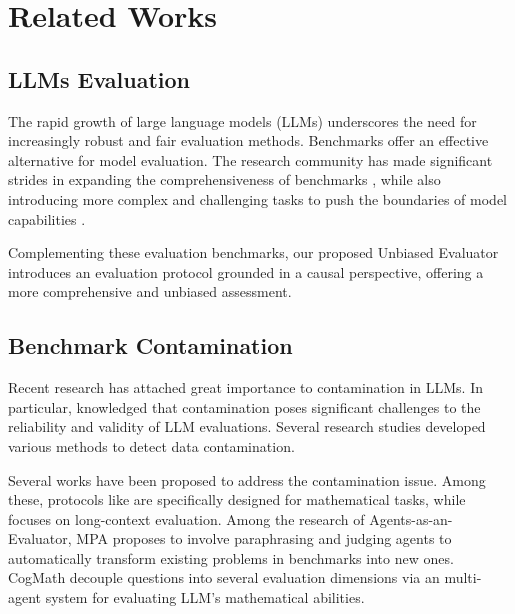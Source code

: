 \section{Related Works}
\subsection{LLMs Evaluation}
The rapid growth of large language models (LLMs) underscores the need for increasingly robust and fair evaluation methods.
Benchmarks offer an effective alternative for model evaluation. The research community has made significant strides in expanding the comprehensiveness of benchmarks \cite{wang2018glue, wang2019superglue, srivastava2022beyond, hendryckstest2021, liang2022holistic, white2024livebench}, while also introducing more complex and challenging tasks to push the boundaries of model capabilities \cite{wei2024measuring, he2024chinese, lightman2023let, aime2024a, amc2023b, he2024olympiadbench}. 

Complementing these evaluation benchmarks, our proposed Unbiased Evaluator introduces an evaluation protocol grounded in a causal perspective, offering a more comprehensive and unbiased assessment.



\subsection{Benchmark Contamination}
Recent research has attached great importance to contamination in LLMs. In particular, \cite{lee2021deduplicating,sainz2023nlp,mcintosh2024inadequacies,riddell2024quantifying,jiang2024does} knowledged that contamination poses significant challenges to the reliability and validity of LLM evaluations. Several research studies \cite{ni2024training} developed various methods to detect data contamination.

Several works \cite{fan2023nphardeval, lei2023s3eval, zhu2023dyval, zhu2024dynamic, liucogmath} have been proposed to address the contamination issue. Among these, protocols like \cite{fan2023nphardeval, zhu2023dyval, liucogmath} are specifically designed for mathematical tasks, while \cite{lei2023s3eval} focuses on long-context evaluation.
Among the research of Agents-as-an-Evaluator\cite{zhu2024dynamic,liucogmath}, MPA \cite{zhu2024dynamic} proposes to involve paraphrasing and judging agents to automatically transform existing problems in benchmarks into new ones. CogMath\cite{liucogmath} decouple questions into several evaluation dimensions via an multi-agent system for evaluating LLM's mathematical
abilities. 

